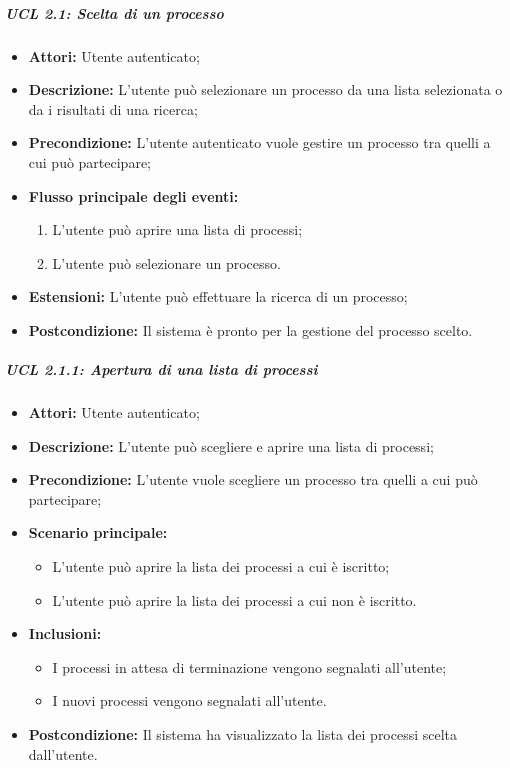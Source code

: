 \subparagraph{UCL 2.1: Scelta di un processo}
\begin{itemize}
\item \textbf{Attori:} Utente autenticato;
\item \textbf{Descrizione:} L'utente può selezionare un processo da una lista selezionata o da i risultati di una ricerca;
\item \textbf{Precondizione:} L'utente autenticato vuole gestire un processo tra quelli a cui può partecipare;
\item \textbf{Flusso principale degli eventi:}
\begin{enumerate}
\item L'utente può aprire una lista di processi;
\item L'utente può selezionare un processo.
\end{enumerate}
\item \textbf{Estensioni:} L'utente può effettuare la ricerca di un processo;
\item \textbf{Postcondizione:} Il sistema è pronto per la gestione del processo scelto.
\end{itemize}

\subparagraph{UCL 2.1.1: Apertura di una lista di processi}
\begin{itemize}
\item \textbf{Attori:} Utente autenticato;
\item \textbf{Descrizione:} L'utente può scegliere e aprire una lista di processi;
\item \textbf{Precondizione:} L'utente vuole scegliere un processo tra quelli a cui può partecipare;
\item \textbf{Scenario principale:}
\begin{itemize}
\item L'utente può aprire la lista dei processi a cui è iscritto;
\item L'utente può aprire la lista dei processi a cui non è iscritto.
\end{itemize}
\item \textbf{Inclusioni:}
\begin{itemize}
\item I processi in attesa di terminazione vengono segnalati all'utente;
\item I nuovi processi vengono segnalati all'utente.
\end{itemize}
\item \textbf{Postcondizione:} Il sistema ha visualizzato la lista dei processi scelta dall'utente.
\end{itemize}

